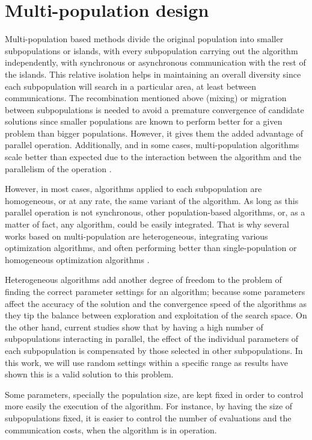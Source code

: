 \documentclass[review]{elsarticle}
\begin{document}
\section{Multi-population design}

Multi-population based methods divide the original population into
smaller subpopulations or islands, with every subpopulation carrying out the
algorithm independently, with synchronous or asynchronous communication with the
rest of the islands. This relative isolation helps in maintaining an overall
diversity since each subpopulation will search in a particular area, at least
between communications. The recombination mentioned above (mixing) or migration
between subpopulations is needed to avoid a premature convergence of candidate
solutions since smaller populations are known to perform better for a given
problem than bigger populations. However, it gives them the added advantage of
parallel operation. Additionally, and in some cases, multi-population algorithms
scale better than expected due to the interaction between the algorithm and the
parallelism of the operation \cite{ALBA20027}.

However, in most cases, algorithms applied to each subpopulation are
homogeneous, or at any rate, the same variant of the algorithm. As long as this
parallel operation is not synchronous, other population-based algorithms, or, as
a matter of fact, any algorithm, could be easily integrated. That is why several
works based on multi-population are heterogeneous, integrating various
optimization algorithms, and often performing better than single-population or
homogeneous optimization algorithms \cite{wu2016differential,nseef2016adaptive}.

Heterogeneous algorithms add another degree of freedom to the problem of finding
the correct parameter settings for an algorithm; because some parameters affect
the accuracy of the solution and the convergence speed of the algorithms as they
tip the balance between exploration and exploitation of the search space. On the
other hand, current studies show that by having a high number of subpopulations
interacting in parallel, the effect of the individual parameters of each
subpopulation is compensated by those selected in other subpopulations. In this
work, we will use random settings within a specific range as results have shown
this is a valid solution to this problem. 

Some parameters, specially the population size, are
kept fixed in order to control more easily the execution of the algorithm. For
instance, by having the size of subpopulations fixed, it is easier to control
the number of evaluations and the communication costs, when the algorithm is in
operation.
\end{document}
